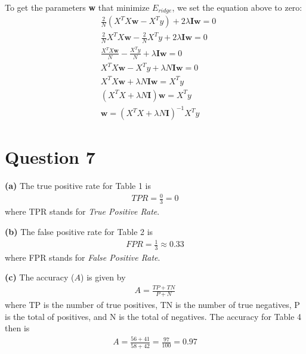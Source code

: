 \documentclass[leqno]{article}
\begin{document}
To get the parameters \textbf{w} that minimize $E_{ridge}$, we set the equation above to zero:
\begin{equation*}
\begin{split}
& \frac{2}{N}(X^TX\textbf{w} - X^Ty) + 2\lambda\textbf{I}\textbf{w} = 0\\
& \frac{2}{N}X^TX\textbf{w} - \frac{2}{N}X^Ty + 2\lambda\textbf{I}\textbf{w} = 0\\
& \frac{X^TX\textbf{w}}{N} - \frac{X^Ty}{N} + \lambda\textbf{I}\textbf{w} = 0\\
& X^TX\textbf{w} - X^Ty + \lambda N\textbf{I}\textbf{w} = 0\\
& X^TX\textbf{w} + \lambda N\textbf{I}\textbf{w} = X^Ty\\
& (X^TX + \lambda N\textbf{I})\textbf{w} = X^Ty\\
& \textbf{w} = (X^TX + \lambda N\textbf{I})^{-1}X^Ty
\end{split}
\end{equation*}

\hfill

\section*{Question 7} \textbf{(a)} The true positive rate for Table 1 is
\begin{equation*}
\begin{split}
TPR = \frac{0}{3} = 0
\end{split}
\end{equation*} 
where TPR stands for \textit{True Positive Rate}.

\hfill

\noindent \textbf{(b)} The false positive rate for Table 2 is
\begin{equation*}
\begin{split}
FPR = \frac{1}{3} \approx 0.33
\end{split}
\end{equation*} 
where FPR stands for \textit{False Positive Rate}.

\hfill

\noindent \textbf{(c)} The accuracy ($A$) is given by
\begin{equation*}
\begin{split}
A = \frac{TP + TN}{P + N}
\end{split}
\end{equation*} 
where TP is the number of true positives, TN is the number of true negatives, P is the total of positives, and N is 
the total of negatives. The accuracy for Table 4 then is
\begin{equation*}
\begin{split}
A = \frac{56 + 41}{58 + 42} = \frac{97}{100} = 0.97 
\end{split}
\end{equation*} 
\end{document}
